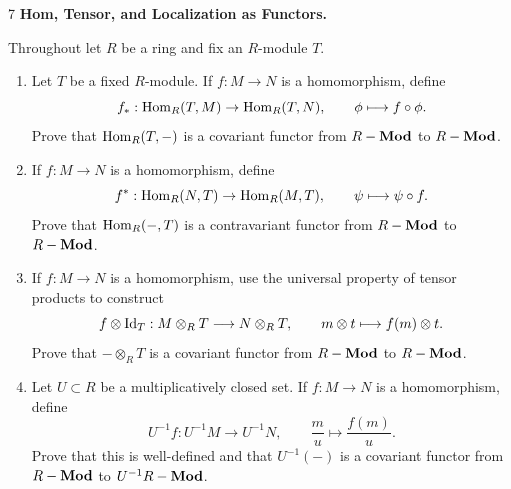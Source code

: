 \documentclass[Notebook.tex]{subfiles}
\begin{document}
\begin{problem}{7} \textbf{Hom, Tensor, and Localization as Functors.} 
    
    Throughout let $R$ be a ring and fix an $R$-module $T$.
    \begin{enumerate}
        \item Let $T$ be a fixed $R$-module. If $f:M\to N$ is a homomorphism, define
        \[
        f_*:\operatorname{Hom}_R(T,M)\to \operatorname{Hom}_R(T,N),
        \qquad
        \phi\longmapsto f\circ \phi.
        \]
        Prove that $\operatorname{Hom}_R(T,-)$ is a covariant functor from $R-\operatorname{\textbf{Mod}}$ to $R-\operatorname{\textbf{Mod}}$.
        \item If $f:M\to N$ is a homomorphism, define
        \[
        f^*:\operatorname{Hom}_R(N,T)\to \operatorname{Hom}_R(M,T),
        \qquad
        \psi\longmapsto \psi\circ f.
        \]
        Prove that $\operatorname{Hom}_R(-,T)$ is a contravariant functor from $R-\operatorname{\textbf{Mod}}$ to $R-\operatorname{\textbf{Mod}}$.
        \item If $f:M\to N$ is a homomorphism, use the universal property of tensor products to construct
        \[
        f\otimes \operatorname{Id}_T:M\otimes_R T\longrightarrow N\otimes_R T,
        \qquad
        m\otimes t\longmapsto f(m)\otimes t.
        \]
        Prove that $-\otimes_R T$ is a covariant functor from $R-\operatorname{\textbf{Mod}}$ to $R-\operatorname{\textbf{Mod}}$.
        \item Let $U\subset R$ be a multiplicatively closed set. If $f:M\to N$ is a homomorphism, define
        \[
        U^{-1}f:U^{-1}M\to U^{-1}N,
        \qquad
        \frac{m}{u}\longmapsto \frac{f(m)}{u}.
        \]
        Prove that this is well-defined and that $U^{-1}(-)$ is a covariant functor from $R-\operatorname{\textbf{Mod}}$ to $U^{-1}R-\operatorname{\textbf{Mod}}$.
    \end{enumerate}    
\end{problem}
\end{document}
